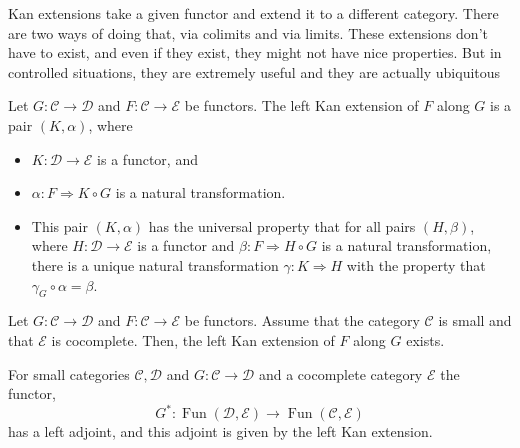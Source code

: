 Kan extensions take a given functor and extend it to a different category. There are two ways of doing that, via colimits and via limits. These extensions don’t have to exist, and even if they exist, they might not have nice properties. But in controlled situations, they are extremely useful and they are actually ubiquitous

Let $G: \mathcal{C} \rightarrow \mathcal{D}$ and $F: \mathcal{C} \rightarrow \mathcal{E}$ be functors. The left Kan extension of $F$ along $G$ is a pair $(K, \alpha)$, where
\begin{itemize}
    \item $K: \mathcal{D} \rightarrow \mathcal{E}$ is a functor, and
    \item $\alpha: F \Rightarrow K \circ G$ is a natural transformation. %
    \item This pair $(K, \alpha)$ has the universal property that for all pairs $(H, \beta)$, where $H: \mathcal{D} \rightarrow \mathcal{E}$ is a functor and $\beta: F \Rightarrow H \circ G$ is a natural transformation, there is a unique natural transformation $\gamma: K \Rightarrow H$ with the property that $\gamma_G \circ \alpha=\beta$.
\end{itemize}

\begin{theo}
Let $G: \mathcal{C} \rightarrow \mathcal{D}$ and $F: \mathcal{C} \rightarrow \mathcal{E}$ be functors. Assume that the category $\mathcal{C}$ is small and that $\mathcal{E}$ is cocomplete. Then, the left Kan extension of $F$ along $G$ exists.
\end{theo}

\begin{theo}
For small categories $\mathcal{C}, \mathcal{D}$ and $G: \mathcal{C} \rightarrow \mathcal{D}$ and a cocomplete category $\mathcal{E}$ the functor,
$$
G^*: \operatorname{Fun}(\mathcal{D}, \mathcal{E}) \rightarrow \operatorname{Fun}(\mathcal{C}, \mathcal{E})
$$
has a left adjoint, and this adjoint is given by the left Kan extension.
\end{theo}

